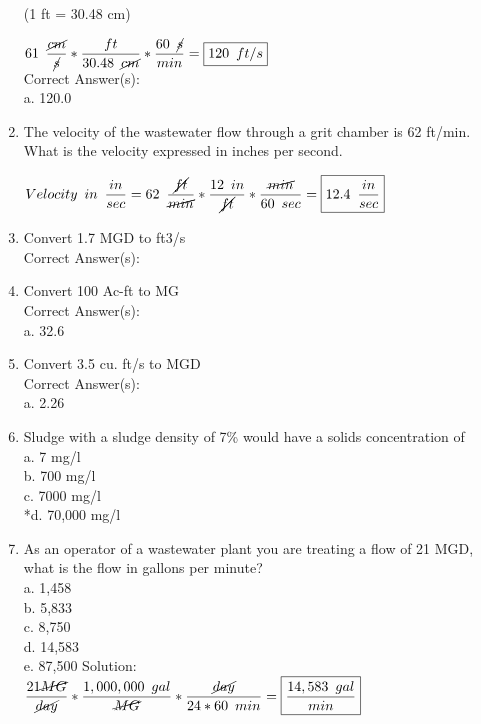 \documentclass{article}
\begin{document}
\begin{enumerate}
(1 ft = 30.48 cm)

$61 \enspace \dfrac{\cancel{cm}}{\cancel{s}} * \dfrac{ft}{30.48 \enspace \cancel{cm}}* \dfrac{60 \enspace \cancel{s}}{min} =  \boxed{120 \enspace ft/s}$\\
Correct Answer(s):\\
a. 120.0 \\

\item The velocity of the wastewater flow through a grit chamber is 62 ft/min.  What is the velocity expressed in inches per second.


$Velocity \enspace in \enspace \dfrac{in}{sec} = 62 \enspace \dfrac{\cancel{ft}}{\cancel{min}} * \dfrac{12 \enspace in}{\cancel{ft}}* \dfrac{\cancel{min}}{60 \enspace sec} =  \boxed{12.4 \enspace \dfrac{in}{sec}}$\\


\item Convert 1.7 MGD to ft3/s\\
Correct Answer(s):\\

\item Convert 100 Ac-ft to MG\\
Correct Answer(s):\\
a. 32.6\\

\item Convert 3.5 cu. ft/s to MGD\\
Correct Answer(s):\\
a. 2.26\\

\item Sludge with a sludge density of 7\% would have a solids concentration of\\
a. 7 mg/l\\
b. 700 mg/l\\
c. 7000 mg/l\\
*d. 70,000 mg/l



\item As an operator of a wastewater plant you are treating a flow of 21 MGD, what is the flow in gallons per minute?\\
a. 1,458\\b. 5,833 \\c. 8,750 \\d. 14,583 \\e. 87,500
Solution:\\
$\dfrac{21 \cancel{MG}}{\cancel{day}}*\dfrac{1,000,000 \enspace gal}{\cancel{MG}}*\dfrac{\cancel{day}}{24*60 \enspace min}=\boxed{\dfrac{14,583 \enspace gal}{min}}$\\



\end{enumerate}
\end{document}
